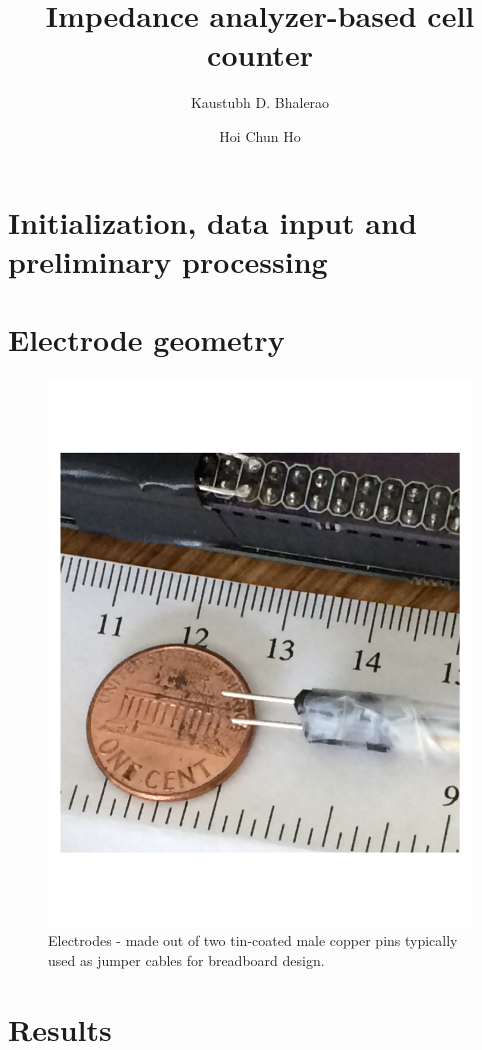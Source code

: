 \documentclass{article}\usepackage[]{graphicx}\usepackage[]{color}
\title{Impedance analyzer-based cell counter}
\author{Kaustubh D. Bhalerao \and Hoi Chun Ho}
\begin{document}
\maketitle

\section{Initialization, data input and preliminary processing}







\section{Electrode geometry}

\begin{figure}[H]
\begin{center}
\includegraphics[width=0.3 \linewidth]{electrode}
\caption{Electrodes - made out of two tin-coated male copper pins typically used as jumper cables for breadboard design.}
\end{center}
\end{figure}

\section{Results}
\end{document}
